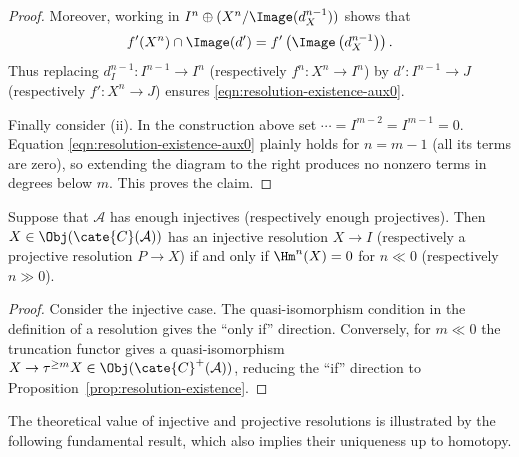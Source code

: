\begin{proof}
	Moreover, working in
	$I^n\oplus(X^n/\Image(d_X^{n-1}))$ shows that
	\[ f'(X^n) \cap \Image(d') = f'\left( \Image\left( d_X^{n-1} \right) \right). \]
	Thus replacing $d_I^{n-1}:I^{n-1}\to I^n$ (respectively
	$f^n:X^n\to I^n$) by $d':I^{n-1}\to J$ (respectively $f':X^n\to J$)
	ensures \eqref{eqn:resolution-existence-aux0}.

	Finally consider (ii). In the construction above set
	$\cdots=I^{m-2}=I^{m-1}=0$. Equation
	\eqref{eqn:resolution-existence-aux0} plainly holds for $n=m-1$ (all its
	terms are zero), so extending the diagram to the right produces no nonzero
	terms in degrees below $m$. This proves the claim.
\end{proof}

\begin{corollary}
	Suppose that $\mathcal{A}$ has enough injectives (respectively enough
	projectives). Then $X\in\Obj(\cate{C}(\mathcal{A}))$ has an injective
	resolution $X\to I$ (respectively a projective resolution $P\to X$) if and
	only if $\Hm^n(X)=0$ for $n\ll0$ (respectively $n\gg0$).
\end{corollary}
\begin{proof}
	Consider the injective case. The quasi-isomorphism condition in the
	definition of a resolution gives the ``only if'' direction. Conversely,
	for $m\ll0$ the truncation functor gives a quasi-isomorphism
	$X\to\tau^{\geq m}X\in\Obj(\cate{C}^+(\mathcal{A}))$, reducing the ``if''
	direction to Proposition~\ref{prop:resolution-existence}.
\end{proof}

The theoretical value of injective and projective resolutions is illustrated
by the following fundamental result, which also implies their uniqueness up to
homotopy.


